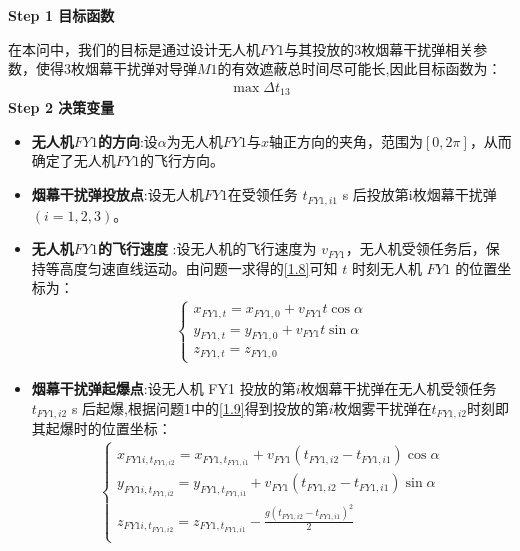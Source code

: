 \documentclass[../main.tex]{subfiles}
\begin{document}
\noindent \textbf{Step 1 目标函数}
\par 在本问中，我们的目标是通过设计无人机$FY1$与其投放的3枚烟幕干扰弹相关参数，使得3枚烟幕干扰弹对导弹$M1$的有效遮蔽总时间尽可能长,因此目标函数为：
\begin{align}\label{12.1}
  \max \Delta t_{13}
\end{align}
\noindent \textbf{Step 2 决策变量}

\begin{itemize}
\item \textbf{无人机$FY1$的方向}:设$\alpha $为无人机$FY1$与$x$轴正方向的夹角，范围为$\left[ 0,2\pi \right] $，从而确定了无人机$FY1$的飞行方向。
\item \textbf{烟幕干扰弹投放点}:设无人机$FY1$在受领任务 \( t_{FY1,i1} \) s 后投放第i枚烟幕干扰弹$(i=1,2,3)$。
\item  \textbf{无人机$FY1$的飞行速度} :设无人机的飞行速度为 \( v_{FY1} \)，无人机受领任务后，保持等高度匀速直线运动。由问题一求得的\eqref{1.8}可知 \( t \) 时刻无人机 \( FY1 \) 的位置坐标为：
\begin{align}\label{12.3}
  \begin{cases}
x_{FY1,t} = x_{FY1,0} + v_{FY1} t \cos\alpha \\
y_{FY1,t} = y_{FY1,0} + v_{FY1} t \sin\alpha \\
z_{FY1,t} = z_{FY1,0}
\end{cases}
\end{align}
\item \textbf{烟幕干扰弹起爆点}:设无人机 FY1 投放的第$i$枚烟幕干扰弹在无人机受领任务 \( t_{FY1,i2} \) s 后起爆,根据问题1中的\eqref{1.9}得到投放的第$i$枚烟雾干扰弹在$t_{FY1,i2}$时刻即其起爆时的位置坐标：
\begin{align}\label{12.4}
\left\{ \begin{array}{l}
	x_{FY1i,t_{FY1,i2}}=x_{FY1,t_{FY1,i1}}+v_{FY1}\left( t_{FY1,i2}-t_{FY1,i1} \right) \cos \alpha\\
	y_{FY1i,t_{FY1,i2}}=y_{FY1,t_{FY1,i1}}+v_{FY1}\left( t_{FY1,i2}-t_{FY1,i1} \right) \sin \alpha\\
	z_{FY1i,t_{FY1,i2}}=z_{FY1,t_{FY1,i1}}-\frac{g\left( t_{FY1,i2}-t_{FY1,i1} \right) ^2}{2}\\
\end{array} \right. 
\end{align}


\end{itemize}
\end{document}
